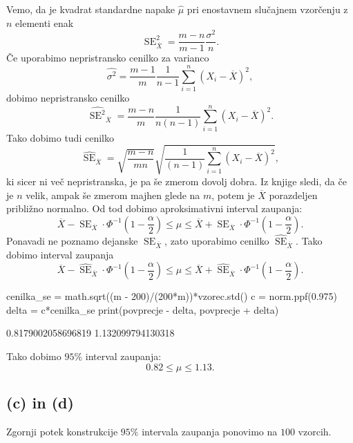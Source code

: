 \documentclass[10pt, a4paper]{article}
\DeclareMathOperator{\se}{SE}
\begin{document}
Vemo, da je kvadrat standardne napake $\hat{\mu}$ pri enostavnem slučajnem vzorčenju 
z $n$ elementi enak 
$$\se_{\overline{X}} ^2 = \frac{m - n}{m - 1} \frac{\sigma^2}{n}.$$
Če uporabimo nepristransko cenilko za varianco
$$\widehat{\sigma^2} = \frac{m - 1}{m} \frac{1}{n - 1} \sum_{i = 1}^n (X_i - \overline{X})^2,$$
dobimo nepristransko cenilko 
$$\widehat{\se ^2}_{\overline{X}} = \frac{m - n}{m} \frac{1}{n(n - 1)} \sum_{i = 1}^n (X_i - \overline{X})^2.$$
Tako dobimo tudi cenilko 
$$\widehat{\se}_{\overline{X}} = \sqrt{\frac{m - n}{mn}}  \sqrt{\frac{1}{(n - 1)} \sum_{i = 1}^n (X_i - \overline{X})^2},$$
ki sicer ni več nepristranska, je pa še zmerom dovolj dobra.
Iz knjige \cite{rice} sledi, da če je $n$ velik, ampak še zmerom majhen glede na $m$,
potem je $\overline{X}$ porazdeljen približno normalno. Od tod dobimo aproksimativni interval zaupanja:
$$\overline{X} - \se_{\overline{X}} \cdot \Phi^{-1} \left(1 - \frac{\alpha}{2}\right) \leq \mu \leq \overline{X} + \se_{\overline{X}} \cdot \Phi^{-1} \left(1 - \frac{\alpha}{2}\right).$$
Ponavadi ne poznamo dejanske $\se_{\overline{X}}$, zato uporabimo cenilko $\widehat{\se}_{\overline{X}}$. Tako dobimo interval zaupanja
$$\overline{X} - \widehat{\se}_{\overline{X}} \cdot \Phi^{-1} \left(1 - \frac{\alpha}{2}\right) \leq \mu \leq \overline{X} + \widehat{\se}_{\overline{X}} \cdot \Phi^{-1} \left(1 - \frac{\alpha}{2}\right).$$

\begin{python}
    cenilka_se = math.sqrt((m - 200)/(200*m))*vzorec.std()
    c = norm.ppf(0.975)
    delta = c*cenilka_se
    print(povprecje - delta, povprecje + delta)
\end{python}

\begin{python}
    0.8179002058696819 1.132099794130318
\end{python}

Tako dobimo $95\%$ interval zaupanja:
$$0.82 \leq \mu \leq 1.13.$$

\subsection*{(c) in (d)}

Zgornji potek konstrukcije $95\%$ intervala zaupanja ponovimo na $100$ vzorcih.
\end{document}
